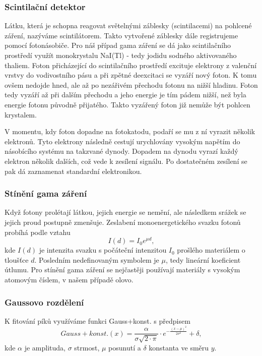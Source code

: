 \documentclass[english]{article}
\begin{document}
			\subsubsection{Scintilační detektor}
						Látku, která je schopna reagovat světelnými záblesky (scintilacemi) na pohlcené záření, nazýváme scintilátorem. Takto vytvořené záblesky dále registrujeme pomocí fotonásobiče. Pro náš případ gama záření se dá jako scintilačního prostředí využít monokrystalu NaI(Tl) - tedy jodidu sodného aktivovaného thaliem. Foton přicházející do scintilačního prostředí excituje elektrony z valenční vrstvy do vodivostního pásu a při zpětné deexcitaci se vyzáří nový foton. K tomu ovšem nedojde hned, ale až po nezářivém přechodu fotonu na nižší hladinu. Foton tedy vyzáří až při dalším přechodu a jeho energie je tím pádem nižší, než byla energie fotonu původně přijatého. Takto vyzářený foton již nemůže být pohlcen krystalem. 
						
						V momentu, kdy foton dopadne na fotokatodu, podaří se mu z ní vyrazit několik elektronů. Tyto elektrony následně cestují urychlovány vysokým napětím do násobícího systému na takzvané dynody. Dopadem na dynodu vyrazí každý elektron několik dalších, což vede k zesílení signálu. Po dostatečném zesílení se pak dá zaznamenat standardní elektronikou. 
						
			\subsubsection{Stínění gama záření}
						Když fotony prolétají látkou, jejich energie se nemění, ale následkem srážek se jejich proud postupně zmenšuje. Zeslabení monoenergetického svazku fotonů probíhá podle vztahu
						\begin{equation}
								I(d) = I_0e^{\mu d},
						\label{eq:olovo}
						\end{equation}
						kde $I(d)$ je intenzita svazku s počáteční intenzitou $I_0$ prošlého materiálem o tloušťce $d$. Posledním nedefinovaným symbolem je $\mu$, tedy lineární koeficient útlumu. Pro stínění gama záření se nejčastěji používají materiály s vysokým atomovým číslem, v našem případě olovo. 
			
			\subsubsection{Gaussovo rozdělení}
						K fitování píků využíváme funkci Gauss+konst. s předpisem
						\begin{equation}
								Gauss+konst.(x) = \frac{\alpha}{\sigma \sqrt{2\cdot \pi}} \cdot e^{-\frac{(x-\mu)^2}{2\sigma^2}} + \delta,
						\label{eq:gauss}
						\end{equation}
			kde $\alpha$ je amplituda, $\sigma$ strmost, $\mu$ posunutí a $\delta$ konstanta ve směru $y$.
			
\end{document}
